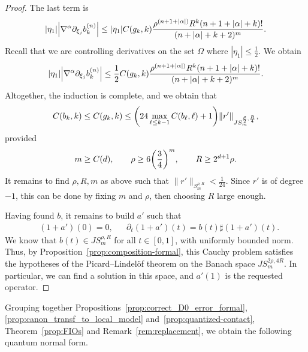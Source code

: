 \documentclass[AHL,Unicode,longabstracts,published]{cedram}
\newcommand\1{\mathds{1}}
\let\originalleft\left
\let\originalright\right
\renewcommand{\left}{\mathopen{}\mathclose\bgroup\originalleft}
\renewcommand{\right}{\aftergroup\egroup\originalright}
\begin{document}
\begin{proof}
The last term is
\[
|\eta_{1}|\left|\nabla^{\alpha}\partial_{\xi_j}b_k^{(n)}\right|
\leq |\eta_{1}|C(g_k,k)\frac{\rho^{(n+1+|\alpha|)}R^k(n+1+|\alpha|+k)!}{(n+|\alpha|+k+2)^m}.
\]
Recall that we are controlling derivatives on the set $\Omega$ where $|\eta_1|\leq \frac 12$. We obtain
\[
|\eta_{1}|\left|\nabla^{\alpha}\partial_{\xi_j}b_k^{(n)}
\right|\leq
\frac 12 C(g_k,k)\frac{\rho^{(n+1+|\alpha|)}R^k(n+1+|\alpha|+k)!}{(n+|\alpha|+k+2)^m}.
\]
Altogether, the induction is complete, and we obtain that
\[
C(b_k,k)\leq C(g_k,k)\leq \left(24\max_{\ell\leq k-1}C(b_{\ell},\ell)+1\right)\|r'\|_{JS^{\frac{\rho}2, \frac R4}_{m}},
\]
provided
\begin{align*}
m\geq C(d),\qquad\rho\geq 6\left(\frac 34\right)^m,\qquad R\geq 2^{d+1}\rho.
\end{align*}
It remains to find $\rho,R,m$ as above such that $\|r'\|_{S^{\rho,R}_m}<\frac{1}{24}$. Since $r'$ is of degree $-1$, this can be done by fixing $m$ and $\rho$, then choosing $R$ large enough.

Having found $b$, it remains to build $a'$ such that
\begin{align*}
&(1+a')(0)=0,& &\partial_t (1+a')(t) = b(t)\sharp (1+a')(t).
\end{align*}
We know that $b(t)\in JS^{\rho,R}_m$ for all $t\in [0,1]$, with uniformly bounded norm. Thus, by Proposition~\ref{prop:composition-formal}, this Cauchy problem satisfies the hypotheses of the Picard--Lindel\"of theorem on the Banach space $JS^{2\rho,4R}_m$. In particular, we can find a solution in this space, and $a'(1)$ is the requested operator.
\end{proof}

Grouping together Propositions~\ref{prop:correct_D0_error_formal}, \ref{prop:canon_transf_to_local_model} and~\ref{prop:quantized-contact}, Theorem~\ref{prop:FIOs} and Remark~\ref{rem:replacement}, we obtain the following quantum normal form.
\end{document}
